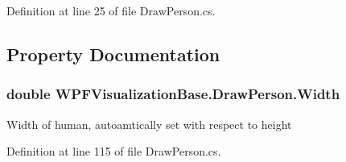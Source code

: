 Definition at line 25 of file Draw\+Person.\+cs.



\subsection{Property Documentation}
\subsubsection[{\texorpdfstring{Width}{Width}}]{\setlength{\rightskip}{0pt plus 5cm}double W\+P\+F\+Visualization\+Base.\+Draw\+Person.\+Width\hspace{0.3cm}{\ttfamily [get]}}\hypertarget{class_w_p_f_visualization_base_1_1_draw_person_a46f8257fc07d8d07d82de5c2be0b0e98}{}\label{class_w_p_f_visualization_base_1_1_draw_person_a46f8257fc07d8d07d82de5c2be0b0e98}


Width of human, autoamtically set with respect to height 



Definition at line 115 of file Draw\+Person.\+cs.

